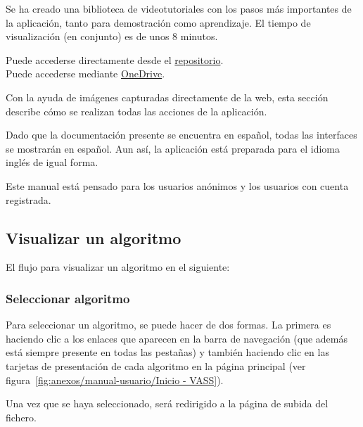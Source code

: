 Se ha creado una biblioteca de videotutoriales con los pasos más importantes de
la aplicación, tanto para demostración como aprendizaje. El tiempo de
visualización (en conjunto) es de unos 8 minutos.

\begin{tcolorbox}[colback=violet!5!white,colframe=violet!75!black,fontupper=\footnotesize,title=Acceso a los videotutoriales]
    Puede accederse directamente desde el \href{https://github.com/dma1004/TFG-SemiSupervisado/tree/main/videos}{repositorio}.\\
    Puede accederse mediante \href{https://universidaddeburgos-my.sharepoint.com/:f:/g/personal/dma1004_alu_ubu_es/Ejk6TXnhLVpHgo0xz55QLhwBkZOof15qkrURXXXQaxQanQ?e=ic5dZT}{OneDrive}.
\end{tcolorbox}

Con la ayuda de imágenes capturadas directamente de la web, esta sección
describe cómo se realizan todas las acciones de la aplicación.

Dado que la documentación presente se encuentra en español, todas las interfaces
se mostrarán en español. Aun así, la aplicación está preparada para el idioma
inglés de igual forma.

Este manual está pensado para los usuarios anónimos y los usuarios con cuenta
registrada.

\subsection{Visualizar un algoritmo}

El flujo para visualizar un algoritmo en el siguiente:


\subsubsection{Seleccionar algoritmo}
Para seleccionar un algoritmo, se puede hacer de dos formas. La primera es
haciendo clic a los enlaces que aparecen en la barra de navegación (que además
está siempre presente en todas las pestañas) y también haciendo clic en las
tarjetas de presentación de cada algoritmo en la página principal (ver
figura~\ref{fig:anexos/manual-usuario/Inicio - VASS}).


Una vez que se haya seleccionado, será redirigido a la página de subida del
fichero. 

